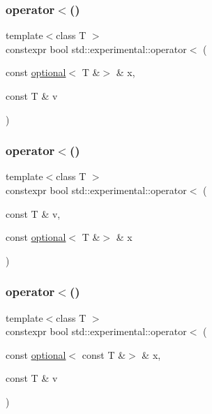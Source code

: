 \mbox{\label{namespacestd_1_1experimental_a83a84dd901351c69fb0e53efe17526eb}} 
\subsubsection{\texorpdfstring{operator$<$()}{operator<()}\hspace{0.1cm}{\footnotesize\ttfamily [6/9]}}
{\footnotesize\ttfamily template$<$class T $>$ \\
constexpr bool std\+::experimental\+::operator$<$ (\begin{DoxyParamCaption}\item[{const \mbox{\hyperlink{classstd_1_1experimental_1_1optional}{optional}}$<$ T \&$>$ \&}]{x,  }\item[{const T \&}]{v }\end{DoxyParamCaption})}

\mbox{\label{namespacestd_1_1experimental_ae8fc20bba7e30d2ad7bc8646ec1de715}} 
\subsubsection{\texorpdfstring{operator$<$()}{operator<()}\hspace{0.1cm}{\footnotesize\ttfamily [7/9]}}
{\footnotesize\ttfamily template$<$class T $>$ \\
constexpr bool std\+::experimental\+::operator$<$ (\begin{DoxyParamCaption}\item[{const T \&}]{v,  }\item[{const \mbox{\hyperlink{classstd_1_1experimental_1_1optional}{optional}}$<$ T \&$>$ \&}]{x }\end{DoxyParamCaption})}

\mbox{\label{namespacestd_1_1experimental_afd3f43608dc3267d32ee592ae88fba55}} 
\subsubsection{\texorpdfstring{operator$<$()}{operator<()}\hspace{0.1cm}{\footnotesize\ttfamily [8/9]}}
{\footnotesize\ttfamily template$<$class T $>$ \\
constexpr bool std\+::experimental\+::operator$<$ (\begin{DoxyParamCaption}\item[{const \mbox{\hyperlink{classstd_1_1experimental_1_1optional}{optional}}$<$ const T \&$>$ \&}]{x,  }\item[{const T \&}]{v }\end{DoxyParamCaption})}

